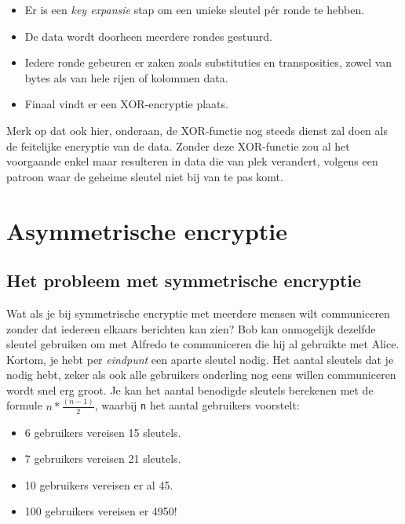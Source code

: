 \documentclass[
  10pt,
  dutch,
  paper=a4,
  ,captions=tableheading
]{scrbook}
\providecommand{\tightlist}{%
  \setlength{\itemsep}{0pt}\setlength{\parskip}{0pt}}
\begin{document}
\begin{itemize}
\tightlist
\item
  Er is een \emph{key expansie} stap om een unieke sleutel pér ronde te
  hebben.
\item
  De data wordt doorheen meerdere rondes gestuurd.
\item
  Iedere ronde gebeuren er zaken zoals substituties en transposities,
  zowel van bytes als van hele rijen of kolommen data.
\item
  Finaal vindt er een XOR-encryptie plaats.
\end{itemize}

Merk op dat ook hier, onderaan, de XOR-functie nog steeds dienst zal
doen als de feitelijke encryptie van de data. Zonder deze XOR-functie
zou al het voorgaande enkel maar resulteren in data die van plek
verandert, volgens een patroon waar de geheime sleutel niet bij van te
pas komt.

\section{Asymmetrische encryptie}\label{asymmetrische-encryptie}

\subsection{Het probleem met symmetrische
encryptie}\label{het-probleem-met-symmetrische-encryptie}

Wat als je bij symmetrische encryptie met meerdere mensen wilt
communiceren zonder dat iedereen elkaars berichten kan zien? Bob kan
onmogelijk dezelfde sleutel gebruiken om met Alfredo te communiceren die
hij al gebruikte met Alice. Kortom, je hebt per \emph{eindpunt} een
aparte sleutel nodig. Het aantal sleutels dat je nodig hebt, zeker als
ook alle gebruikers onderling nog eens willen communiceren wordt snel
erg groot. Je kan het aantal benodigde sleutels berekenen met de formule
\(n * \frac{(n - 1)}{2}\), waarbij \texttt{n} het aantal gebruikers
voorstelt:

\begin{itemize}
\tightlist
\item
  6 gebruikers vereisen 15 sleutels.
\item
  7 gebruikers vereisen 21 sleutels.
\item
  10 gebruikers vereisen er al 45.
\item
  100 gebruikers vereisen er 4950!
\end{itemize}
\end{document}
